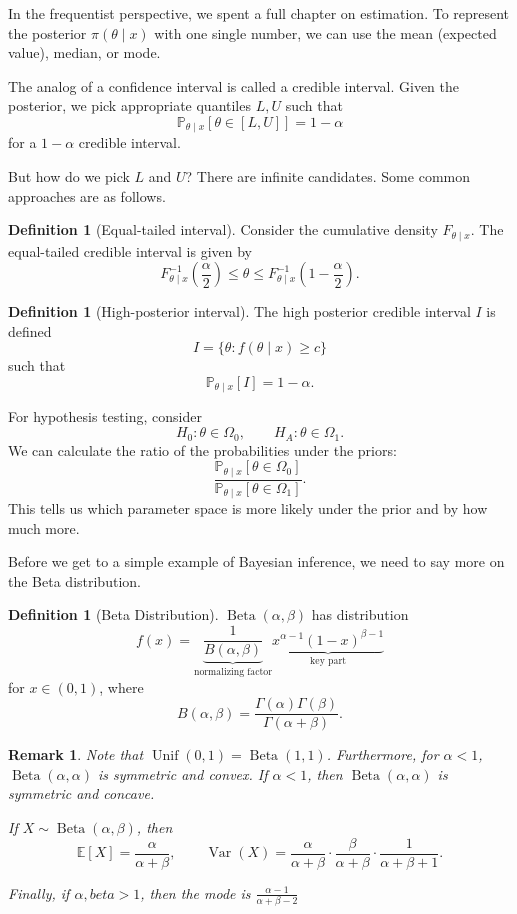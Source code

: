 \documentclass{tufte-handout}
\newcommand*\E{\mathbb{E}}
\renewcommand{\P}{\mathbb{P}}
\newtheorem{rmk}[thm]{Remark}
\theoremstyle{definition}
\newtheorem{defn}[thm]{Definition}
\begin{document}
In the frequentist perspective, we spent a full chapter on estimation. To represent the posterior $\pi(\theta \mid x)$ with one single number, we can use the mean (expected value), median, or mode.

The analog of a confidence interval is called a credible interval. Given the posterior, we pick appropriate quantiles $L,U$ such that \[
	\P_{\theta \mid x}\left[\theta \in \left[ L,U \right]\right] = 1-\alpha 
\] for a $1-\alpha$ credible interval.

But how do we pick $L$ and $U$? There are infinite candidates. Some common approaches are as follows.

\begin{defn}[Equal-tailed interval]
	Consider the cumulative density $F_{\theta \mid x}$. The equal-tailed credible interval is given by \[
		F_{\theta\mid x}^{-1}(\frac{\alpha}{2}) \le \theta \le F_{\theta\mid x}^{-1}(1 - \frac{\alpha}{2})
	.\] 
\end{defn}

\begin{defn}[High-posterior interval]
	The high posterior credible interval $I$ is defined \[
		I = \{\theta: f(\theta \mid x) \ge c\}
	\] such that \[
		\P_{\theta \mid x}\left[I\right] = 1-\alpha
	.\] 
\end{defn}

For hypothesis testing, consider \[
	H_0 : \theta \in \Omega_0 ,\qquad H_A: \theta \in \Omega_1
.\] 
We can calculate the ratio of the probabilities under the priors: \[
	\frac{\P_{\theta \mid x}\left[\theta \in \Omega_0\right] }{\P_{\theta \mid x}\left[\theta \in \Omega_1\right] }
.\] This tells us which parameter space is more likely under the prior and by how much more.

Before we get to a simple example of Bayesian inference, we need to say more on the Beta distribution.
\begin{defn}[Beta Distribution]
	$\operatorname{Beta}(\alpha,\beta)$ has distribution \[
		f(x) = \underbrace{\frac{1}{B(\alpha,\beta)}}_{\text{normalizing factor}} \underbrace{x^{\alpha-1} \left( 1-x \right)^{\beta-1}}_{\text{key part}}
	\] for $x \in (0,1)$, where \[
		B(\alpha,\beta) = \frac{\Gamma(\alpha)\Gamma(\beta)}{\Gamma(\alpha+\beta)}
	.\] 
\end{defn}

\begin{rmk}
	Note that $\operatorname{Unif}(0,1) = \operatorname{Beta}(1,1)$. Furthermore, for $\alpha < 1$, $\operatorname{Beta}(\alpha,\alpha)$ is symmetric and convex. If $\alpha < 1$, then $\operatorname{Beta}(\alpha,\alpha)$ is symmetric and concave.

	If $X \sim \operatorname{Beta}(\alpha,\beta)$, then \[
		\E\left[X\right] = \frac{\alpha}{\alpha+\beta}, \qquad \operatorname{Var}\left(X\right)= \frac{\alpha}{\alpha+\beta}\cdot \frac{\beta}{\alpha+\beta} \cdot \frac{1}{\alpha+\beta+1}
	.\] 

	Finally, if $\alpha,beta > 1$, then the mode is $\frac{\alpha - 1}{\alpha+\beta-2}$
\end{rmk}
\end{document}

